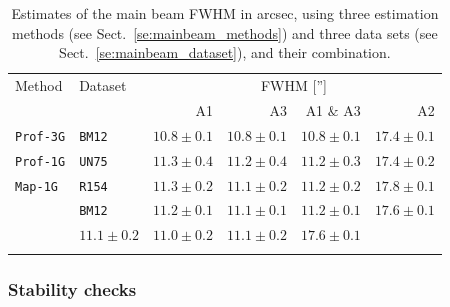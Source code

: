 \begin{table}[!thbp]
  \caption[]{Estimates of the main beam FWHM in arcsec, using three estimation methods (see
    Sect.~\ref{se:mainbeam_methods}) and three data sets
    (see Sect.~\ref{se:mainbeam_dataset}), and their combination.}
  \label{tab:fwhm}
  \centering
  \begin{tabular}{llrrrr}
    \hline\hline
    \noalign{\smallskip}
    Method   &    Dataset   &  \multicolumn{4}{c}{FWHM ['']} \\
    \noalign{\smallskip}\cline{3-6}\noalign{\smallskip}
        &    &   A1 &  A3 & A1 $\&$ A3 &  A2  \\
    \noalign{\smallskip}
    \hline
    \noalign{\smallskip}
    {\tt Prof-3G}  &  {\tt BM12}    & $10.8 \pm 0.1$  &  $10.8 \pm 0.1$  & $10.8 \pm 0.1$  &  $17.4 \pm 0.1$  \\
    {\tt Prof-1G}  &  {\tt UN75}    & $11.3 \pm 0.4$  &  $11.2 \pm 0.4$  & $11.2 \pm 0.3$   & $17.4 \pm 0.2$  \\ 
    {\tt Map-1G}   &  {\tt R154}    & $11.3 \pm 0.2$  &  $11.1 \pm 0.2$  & $11.2 \pm 0.2$  &  $17.8 \pm 0.1$  \\ 
                   &  {\tt BM12}    & $11.2 \pm 0.1$  &  $11.1 \pm 0.1$  & $11.2 \pm 0.1$  &  $17.6 \pm 0.1$  \\
    \noalign{\smallskip}
    \hline
    \noalign{\smallskip}
    \multicolumn{2}{c}{Combined}               & $11.1 \pm 0.2$  & $11.0 \pm 0.2$  & $11.1 \pm 0.2$  &  $17.6 \pm 0.1$  \\
    \noalign{\smallskip}
    \hline
  \end{tabular}
\end{table}

\subsubsection{Stability checks}
\label{se:mainbeam_stability}

